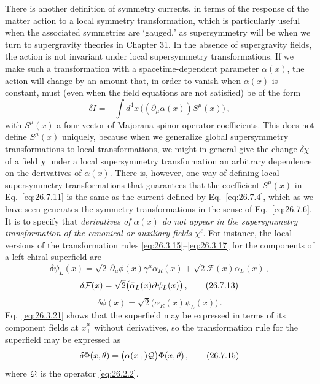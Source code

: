 There is another definition of symmetry currents, in terms of the response
of the matter action to a local symmetry transformation, which is
particularly useful when the associated symmetries are `gauged,' as
supersymmetry will be when we turn to supergravity theories in Chapter 31.
In the absence of supergravity fields, the action is not invariant under
local supersymmetry transformations. If we make such a transformation with a
spacetime-dependent parameter \(\alpha(x)\), the action will change by an
amount that, in order to vanish when \(\alpha(x)\) is constant, must (even
when the field equations are not satisfied) be of the form
\begin{equation}
  \delta I
  =-\int d^4x\,\bigl((\partial_\mu\bar\alpha(x))S^\mu(x)\bigr)\,,
  \tag{26.7.11}\label{eq:26.7.11}
\end{equation}
with \(S^\mu(x)\) a four-vector of Majorana spinor operator coefficients.
This does not define \(S^\mu(x)\) uniquely, because when we generalize global
supersymmetry transformations to local transformations, we might in general
give the change \(\delta\chi\) of a field \(\chi\) under a local
supersymmetry transformation an arbitrary dependence on the derivatives of
\(\alpha(x)\). There is, however, one way of defining local supersymmetry
transformations that guarantees that the coefficient \(S^\mu(x)\) in
Eq.~\eqref{eq:26.7.11} is the same as the current defined by
Eq.~\eqref{eq:26.7.4}, which as we have seen generates the symmetry
transformations in the sense of Eq.~\eqref{eq:26.7.6}. It is to specify that
\emph{derivatives of \(\alpha(x)\) do not appear in the supersymmetry
transformation of the canonical or auxiliary fields \(\chi^\ell\)}. For
instance, the local versions of the transformation rules
\eqref{eq:26.3.15}--\eqref{eq:26.3.17} for the components of a left-chiral
superfield are
\begin{equation}
  \delta\psi_L(x)
  =\sqrt{2}\,\partial_\mu\phi(x)\gamma^\mu\alpha_R(x)
   +\sqrt{2}\mathcal{F}(x)\alpha_L(x)\,,
  \tag{26.7.12}\label{eq:26.7.12}
\end{equation}
\begin{equation}
  \delta\mathcal{F}(x)
  =\sqrt{2}\bigl(\bar\alpha_L(x)\sl{\partial}\psi_L(x)\bigr)\,,
  \tag{26.7.13}\label{eq:26.7.13}
\end{equation}
\begin{equation}
  \delta\phi(x)
  =\sqrt{2}\bigl(\bar\alpha_R(x)\psi_L(x)\bigr)\,.
  \tag{26.7.14}\label{eq:26.7.14}
\end{equation}
Eq.~\eqref{eq:26.3.21} shows that the superfield may be expressed in terms of
its component fields at \(x_+^\mu\) without derivatives, so the
transformation rule for the superfield may be expressed as
\begin{equation}
  \delta\Phi(x,\theta)
  =\bigl(\bar\alpha(x_+)\mathcal{Q}\bigr)\Phi(x,\theta)\,,
  \tag{26.7.15}\label{eq:26.7.15}
\end{equation}
where \(\mathcal{Q}\) is the operator \eqref{eq:26.2.2}.

